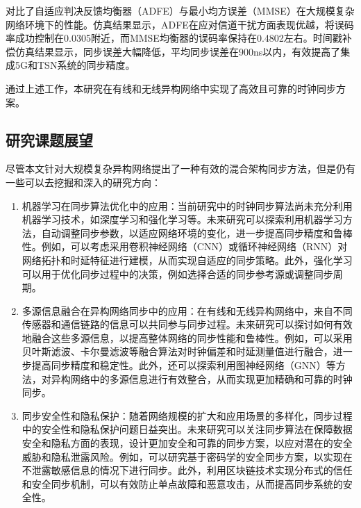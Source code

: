 \documentclass[UTF8,a4paper,12pt]{ctexart}
\numberwithin{equation}{section}
\begin{document}
对比了自适应判决反馈均衡器（ADFE）与最小均方误差（MMSE）在大规模复杂网络环境下的性能。仿真结果显示，ADFE在应对信道干扰方面表现优越，将误码率成功控制在0.0305附近，而MMSE均衡器的误码率保持在0.4802左右。时间戳补偿仿真结果显示，同步误差大幅降低，平均同步误差在900ns以内，有效提高了集成5G和TSN系统的同步精度。

通过上述工作，本研究在有线和无线异构网络中实现了高效且可靠的时钟同步方案。
\subsection{研究课题展望}
 尽管本文针对大规模复杂异构网络提出了一种有效的混合架构同步方法，但是仍有一些可以去挖掘和深入的研究方向：
 
 \begin{enumerate}
 	\item 机器学习在同步算法优化中的应用：当前研究中的时钟同步算法尚未充分利用机器学习技术，如深度学习和强化学习等。未来研究可以探索利用机器学习方法，自动调整同步参数，以适应网络环境的变化，进一步提高同步精度和鲁棒性。例如，可以考虑采用卷积神经网络（CNN）或循环神经网络（RNN）对网络拓扑和时延特征进行建模，从而实现自适应的同步策略。此外，强化学习可以用于优化同步过程中的决策，例如选择合适的同步参考源或调整同步周期。
 	\item 多源信息融合在异构网络同步中的应用：在有线和无线异构网络中，来自不同传感器和通信链路的信息可以共同参与同步过程。未来研究可以探讨如何有效地融合这些多源信息，以提高整体网络的同步性能和鲁棒性。例如，可以采用贝叶斯滤波、卡尔曼滤波等融合算法对时钟偏差和时延测量值进行融合，进一步提高同步精度和稳定性。此外，还可以探索利用图神经网络（GNN）等方法，对异构网络中的多源信息进行有效整合，从而实现更加精确和可靠的时钟同步。
 	
 	\item 同步安全性和隐私保护：随着网络规模的扩大和应用场景的多样化，同步过程中的安全性和隐私保护问题日益突出。未来研究可以关注同步算法在保障数据安全和隐私方面的表现，设计更加安全和可靠的同步方案，以应对潜在的安全威胁和隐私泄露风险。例如，可以研究基于密码学的安全同步方案，以实现在不泄露敏感信息的情况下进行同步。此外，利用区块链技术实现分布式的信任和安全同步机制，可以有效防止单点故障和恶意攻击，从而提高同步系统的安全性。
 \end{enumerate}
\newpage
{}





\newpage
{}
\end{document}
